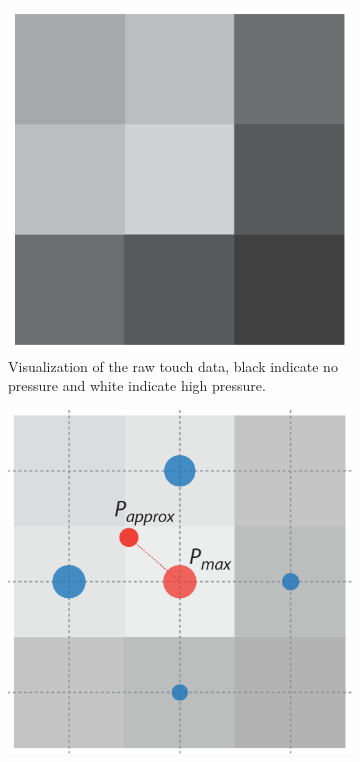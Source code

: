 \begin{figure}[h]
\centering
\begin{subfigure}[t]{.44\textwidth}
  \centering
  \includegraphics[width=\linewidth]{figures/touch/p_map}
  \caption{Visualization of the raw touch data, black indicate no pressure and white indicate high pressure.}
\end{subfigure}%
\hspace{0.02\textwidth}
\begin{subfigure}[t]{.44\textwidth}
  \centering
  \includegraphics[width=\linewidth]{figures/touch/p_approximation}

\end{subfigure}
\end{figure}
